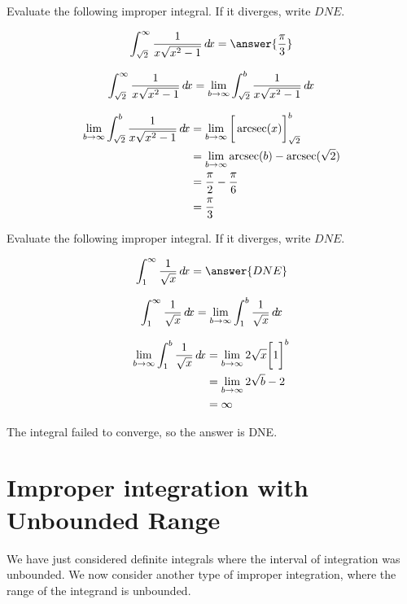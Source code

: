 \documentclass{ximera}
\begin{document}
\begin{example}	
	Evaluate the following improper integral.  If it diverges, write $DNE$.
	
	\[
	\int_{\sqrt{2}}^\infty \frac{1}{x\sqrt{x^2-1}} \d x = \answer{\frac{\pi}{3}}
	\]
	
	\begin{hint}
		\[
		\int_{\sqrt{2}}^\infty \frac{1}{x\sqrt{x^2-1}} \mathop{}\!d\! x = \lim_{b \to \infty} \int_{\sqrt{2}}^b \frac{1}{x\sqrt{x^2-1}}\mathop{}\!d\! x
		\]
	\end{hint}
	\begin{hint}
		\begin{align*}
		 \lim_{b \to \infty} \int_{\sqrt{2}}^b\frac{1}{x\sqrt{x^2-1}} \mathop{}\!d\! x &=  \lim_{b \to \infty} \bigg[ \operatorname{arcsec}(x) \bigg]_{\sqrt{2}}^b \\
		 	&=  \lim_{b \to \infty} \operatorname{arcsec}(b) - \operatorname{arcsec}(\sqrt{2})\\
			&= \frac{\pi}{2} - \frac{\pi}{6}\\
			&=\frac{\pi}{3}
		\end{align*}
	\end{hint}
\end{example}

\begin{example}	
	Evaluate the following improper integral.  If it diverges, write $DNE$.
	
	\[
	\int_{1}^\infty \frac{1}{\sqrt{x}} \d x = \answer{DNE}
	\]
	
	\begin{hint}
		\[
		\int_{1}^\infty \frac{1}{\sqrt{x}} \mathop{}\!d\! x = \lim_{b \to \infty} \int_{1}^b \frac{1}{\sqrt{x}} \mathop{}\!d\! x 
		\]
	\end{hint}
	
	\begin{hint}
		\begin{align*}
		 \lim_{b \to \infty} \int_{1}^b \frac{1}{\sqrt{x}} \mathop{}\!d\! x  &=  \lim_{b \to \infty} 2\sqrt{x} \bigg[ 1 \bigg]^b \\
		 	&=  \lim_{b \to \infty} 2\sqrt{b}  -2\\
			&= \infty
		\end{align*}
		
		The integral failed to converge, so the answer is DNE.
	\end{hint}
\end{example}

\section{Improper integration with Unbounded Range}
We have just considered definite integrals where the interval of integration was unbounded. We now consider another type of improper integration, where the range of the integrand is unbounded.
\end{document}
